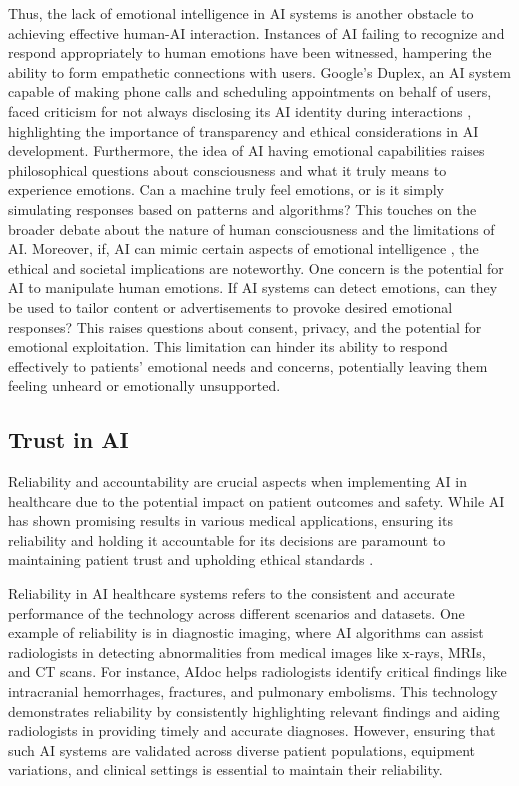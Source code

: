 \documentclass{article}
\begin{document}
Thus, the lack of emotional intelligence in AI systems is another obstacle to achieving effective human-AI interaction. Instances of AI failing to recognize and respond appropriately to human emotions have been witnessed, hampering the ability to form empathetic connections with users. Google's Duplex, an AI system capable of making phone calls and scheduling appointments on behalf of users, faced criticism for not always disclosing its AI identity during interactions \cite{grudin2019chatbots, maedche2019ai}, highlighting the importance of transparency and ethical considerations in AI development.
Furthermore, the idea of AI having emotional capabilities raises philosophical questions about consciousness and what it truly means to experience emotions. Can a machine truly feel emotions, or is it simply simulating responses based on patterns and algorithms? This touches on the broader debate about the nature of human consciousness and the limitations of AI.
Moreover, if, AI can mimic certain aspects of emotional intelligence \cite{more2013philosophy, boden2016ai}, the ethical and societal implications are noteworthy. One concern is the potential for AI to manipulate human emotions. If AI systems can detect emotions, can they be used to tailor content or advertisements to provoke desired emotional responses? This raises questions about consent, privacy, and the potential for emotional exploitation. This limitation can hinder its ability to respond effectively to patients' emotional needs and concerns, potentially leaving them feeling unheard or emotionally unsupported.

\subsection{Trust in AI}

Reliability and accountability are crucial aspects when implementing AI in healthcare due to the potential impact on patient outcomes and safety. While AI has shown promising results in various medical applications, ensuring its reliability and holding it accountable for its decisions are paramount to maintaining patient trust and upholding ethical standards 
 \cite{gille2020we,vourganas2022accountable}.

Reliability in AI healthcare systems refers to the consistent and accurate performance of the technology across different scenarios and datasets. One example of reliability is in diagnostic imaging, where AI algorithms can assist radiologists in detecting abnormalities from medical images like x-rays, MRIs, and CT scans. For instance, AIdoc helps radiologists identify critical findings like intracranial hemorrhages, fractures, and pulmonary embolisms. This technology demonstrates reliability by consistently highlighting relevant findings and aiding radiologists in providing timely and accurate diagnoses. However, ensuring that such AI systems are validated across diverse patient populations, equipment variations, and clinical settings is essential to maintain their reliability.
\end{document}

